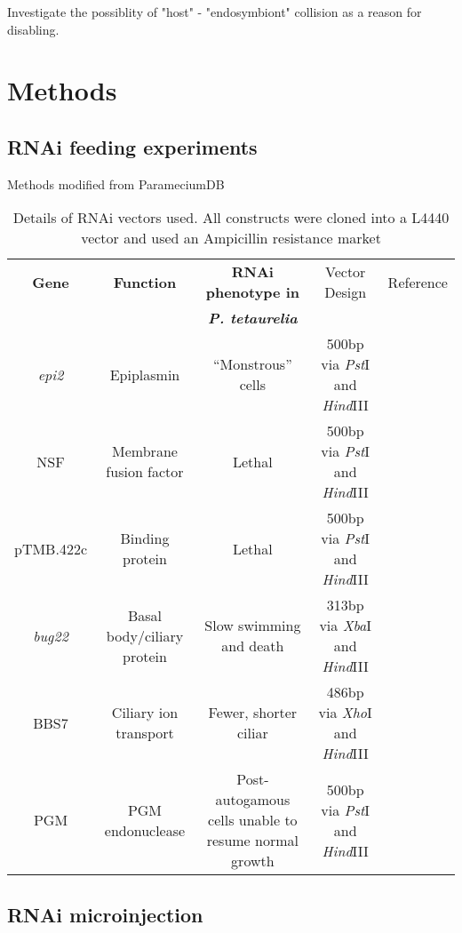 Investigate the possiblity of "host" - "endosymbiont" collision as a reason for disabling.


\section{Methods}

\subsection{RNAi feeding experiments}

Methods modified from ParameciumDB 

\begin{table}
    \begin{tabular}{|c|c|c|c|c|}
        \hline
    \textbf{Gene} & \textbf{Function} & \textbf{RNAi phenotype in}      & Vector Design & Reference \\
                  &                   & \textbf{\textit{P. tetaurelia}} &               &           \\
        \hline
        \textit{epi2} & Epiplasmin & ``Monstrous'' cells  & 500bp via \textit{Pst}I and \textit{Hind}III & \citep{Damaj2009} \\
        NSF & Membrane fusion factor & Lethal & 500bp via \textit{Pst}I and \textit{Hind}III & \citep{Galvani2002} \\
        pTMB.422c & Binding protein & Lethal & 500bp via \textit{Pst}I and \textit{Hind}III & \citep{Nowack2011} \\
        \textit{bug22} & Basal body/ciliary protein & Slow swimming and death & 313bp via \textit{Xba}I and \textit{Hind}III & \citep{Laligne2010} \\
        BBS7 & Ciliary ion transport & Fewer, shorter ciliar & 486bp via \textit{Xho}I and \textit{Hind}III & \citep{Valentine2012} \\
        PGM & PGM endonuclease & Post-autogamous cells unable to resume normal growth & 500bp via \textit{Pst}I and \textit{Hind}III & \citep{Baudry2009} \\
        \hline
    \end{tabular}
    \caption{Details of RNAi vectors used.  All constructs were cloned into a L4440 vector and used an Ampicillin resistance market}
    \label{tab:rnai_vecs}
\end{table}

            


\subsection{RNAi microinjection}


